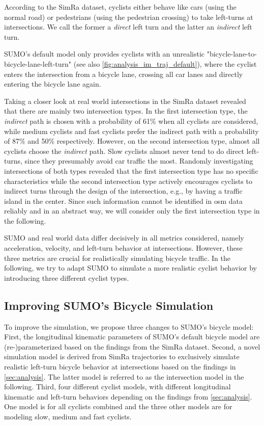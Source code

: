 According to the SimRa dataset, cyclists either behave like cars (using the normal road) or pedestrians (using the pedestrian crossing) to take left-turns at intersections.
We call the former a \textit{direct} left turn and the latter an \textit{indirect} left turn.

SUMO's default model only provides cyclists with an unrealistic "bicycle-lane-to-bicycle-lane-left-turn" (see also \cref{fig:analysis_im_traj_default}), where the cyclist enters the intersection from a bicycle lane, crossing all car lanes and directly entering the bicycle lane again.

Taking a closer look at real world intersections in the SimRa dataset revealed that there are mainly two intersection types.
In the first intersection type, the \textit{indirect} path is chosen with a probability of \num{61}\% when all cyclists are considered, while medium cyclists and fast cyclists prefer the indirect path with a probability of \num{87}\% and \num{50}\% respectively.
However, on the second intersection type, almost all cyclists choose the \textit{indirect} path.
Slow cyclists almost never tend to do direct left-turns, since they presumably avoid car traffic the most.
Randomly investigating intersections of both types revealed that the first intersection type has no specific characteristics while the second intersection type actively encourages cyclists to indirect turns through the design of the intersection, e.g., by having a traffic island in the center.
Since such information cannot be identified in \ac{osm} data reliably and in an abstract way, we will consider only the first intersection type in the following.

SUMO and real world data differ decisively in all metrics considered, namely acceleration, velocity, and left-turn behavior at intersections.
However, these three metrics are crucial for realistically simulating bicycle traffic.
In the following, we try to adapt SUMO to simulate a more realistic cyclist behavior by introducing three different cyclist types.


\subsection{Improving SUMO's Bicycle Simulation}
\label{subsec:improving_sumos_bicycle_simulation}
To improve the simulation, we propose three changes to SUMO's bicycle model:
First, the longitudinal kinematic parameters of SUMO's default bicycle model are \mbox{(re-)}parameterized based on the findings from the SimRa dataset.
Second, a novel simulation model is derived from SimRa trajectories to exclusively simulate realistic left-turn bicycle behavior at intersections based on the findings in \cref{sec:analysis}.
The latter model is referred to as the intersection model in the following.
Third, four different cyclist models, with different longitudinal kinematic and left-turn behaviors depending on the findings from \cref{sec:analysis}.
One model is for all cyclists combined and the three other models are for modeling slow, medium and fast cyclists.


